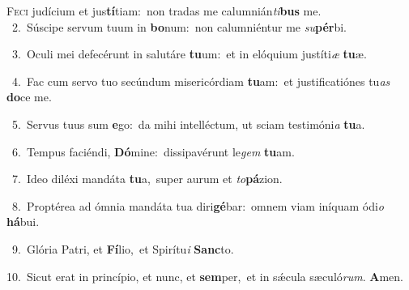 \lettrine{\initial\textcolor{\initialcolor}{F}}{eci} judícium et jus\-\textbf{tí}\-tiam:~\star non tradas me calumnián\-\textit{ti}\-\textbf{bus} me.\\
{\numbfont\textcolor{\numbcolor}{~2.}}~Súscipe servum tuum in \textbf{bo}\-num:~\star non calumniéntur me \textit{su}\-\textbf{pér}bi.\par
{\numbfont\textcolor{\numbcolor}{~3.}}~Oculi mei defecérunt in salutáre \textbf{tu}\-um:~\star et in elóquium justíti\textit{æ} \textbf{tu}\-æ.\par
{\numbfont\textcolor{\numbcolor}{~4.}}~Fac cum servo tuo secúndum misericórdiam \textbf{tu}\-am:~\star et justificatiónes tu\textit{as} \textbf{do}\-ce me.\par
{\numbfont\textcolor{\numbcolor}{~5.}}~Servus tuus sum \textbf{e}\-go:~\star da mihi intelléctum, ut sciam testimóni\textit{a} \textbf{tu}\-a.\par
{\numbfont\textcolor{\numbcolor}{~6.}}~Tempus faciéndi, \textbf{Dó}\-mine:~\star dissipavérunt le\textit{gem} \textbf{tu}\-am.\par
{\numbfont\textcolor{\numbcolor}{~7.}}~Ideo diléxi mandáta \textbf{tu}\-a,~\star super aurum et \textit{to}\-\textbf{pá}zion.\par
{\numbfont\textcolor{\numbcolor}{~8.}}~Proptérea ad ómnia mandáta tua diri\-\textbf{gé}\-bar:~\star omnem viam iníquam ódi\textit{o} \textbf{há}\-bui.\par
{\numbfont\textcolor{\numbcolor}{~9.}}~Glória Patri, et \textbf{Fí}\-lio,~\star et Spirítu\textit{i} \textbf{Sanc}\-to.\par
{\numbfont\textcolor{\numbcolor}{10.}}~Sicut erat in princípio, et nunc, et \textbf{sem}\-per,~\star et in sǽcula sæculó\-\textit{rum}\-. \textbf{A}\-men.\par
